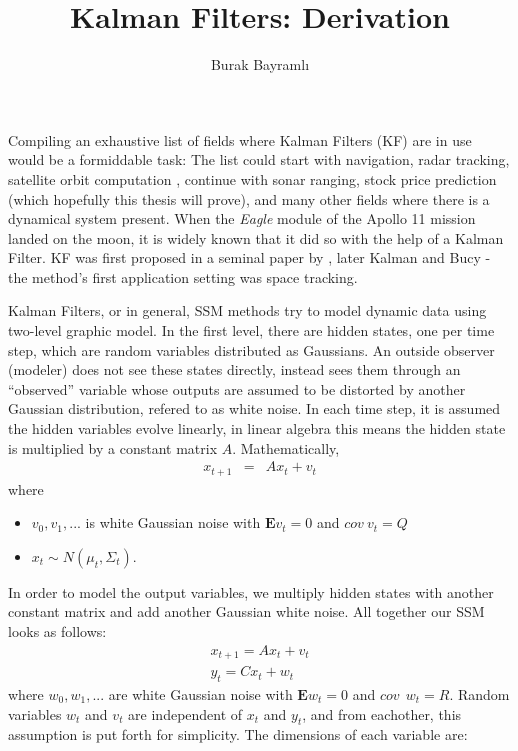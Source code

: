 \documentclass[a4paper,11pt]{article}
\title{Kalman Filters: Derivation}
\author{Burak Bayramlı}
\begin{document}
\maketitle

Compiling an exhaustive list of fields where Kalman Filters (KF) are in use
would be a formiddable task: The list could start with navigation, radar
tracking, satellite orbit computation \cite{welling}, continue with sonar
ranging, stock price prediction (which hopefully this thesis will prove), and
many other fields where there is a dynamical system present. When the {\em
  Eagle} module of the Apollo 11 mission landed on the moon, it is widely known
that it did so with the help of a Kalman Filter. KF was first proposed in a
seminal paper by \cite{kalman}, later Kalman and Bucy \cite{kalman2} - the
method's first application setting was space tracking.

Kalman Filters, or in general, SSM methods try to model dynamic data using
two-level graphic model. In the first level, there are hidden states, one per
time step, which are random variables distributed as Gaussians. An outside
observer (modeler) does not see these states directly, instead sees them through
an ``observed'' variable whose outputs are assumed to be distorted by another
Gaussian distribution, refered to as white noise. In each time step, it is
assumed the hidden variables evolve linearly, in linear algebra this means the
hidden state is multiplied by a constant matrix $A$. Mathematically,
\begin{eqnarray*}
x_{t+1} &=& Ax_t + v_t 
\end{eqnarray*}
where
\begin{itemize}
   \item $v_0,v_1,...$ is white Gaussian noise with $\mathbf{E}v_t = 0$ and $cov
   \: v_t = Q$
   \item $x_t \sim N(\mu_t, \Sigma_t)$.
\end{itemize}
In order to model the output variables, we multiply hidden states with another
constant matrix and add another Gaussian white noise. All together our SSM looks
as follows:
\begin{eqnarray}
x_{t+1} = Ax_t + v_t \label{m1}\\
y_t = Cx_t + w_t \label{m2}
\end{eqnarray}
where $w_0,w_1,...$ are white Gaussian noise with $\mathbf{E}w_t = 0$ and $cov
\:\: w_t = R$. Random variables $w_t$ and $v_t$ are independent of $x_t$
and $y_t$, and from eachother, this assumption is put forth for simplicity. The
dimensions of each variable are:
\end{document}

